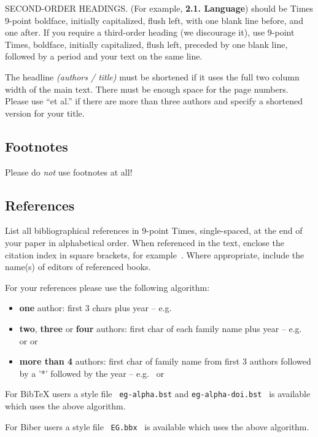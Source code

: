 SECOND-ORDER HEADINGS. (For example, \textbf{2.1. Language}) should be Times
9-point boldface, initially capitalized, flush left, with one blank line
before, and one after. If you require a third-order heading (we discourage
it), use 9-point Times, boldface, initially capitalized, flush left, preceded
by one blank line, followed by a period and your text on the same line.

The headline \emph{(authors / title)} must be shortened if it uses the full 
two column width of the main text.
There must be enough space for the page numbers. Please use ``et al.'' if 
there are more than three authors and specify a shortened version for your title.
\subsection{Footnotes}

Please do \emph{not} use footnotes at all!


\subsection{References}

List all bibliographical references in 9-point Times, single-spaced, at the
end of your paper in alphabetical order. When referenced in the text, enclose
the citation index in square brackets, for example~\cite{Lous90}. Where
appropriate, include the name(s) of editors of referenced books.

For your references please use the following algorithm:
\begin{itemize} 
\item \textbf{one} author: first 3 chars plus year -- 
      e.g.\ \cite{Lous90}
\item \textbf{two}, \textbf{three} or \textbf{four} authors: first char
      of each family name plus year --  e.g.\ \cite{Fellner-Helmberg93} 
      or \cite{Kobbelt97-USHDR} or \cite{Lafortune97-NARF}
\item \textbf{more than 4} authors: first char of family name from 
      first 3 authors followed by a '*' followed by the year -- 
      e.g.\ \cite{Buhmann:1998:DCQ} or \cite{FolDamFeiHug.etal93} 
\end{itemize}

For BibTeX users a style file \ \texttt{eg-alpha.bst} and 
\texttt{eg-alpha-doi.bst} \ is available which uses the above algorithm.

For Biber users a style file \ \texttt{EG.bbx} \ is available which uses the above algorithm.
